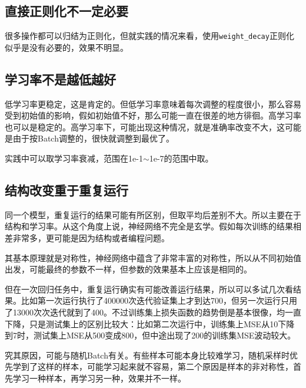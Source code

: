 \subsection{直接正则化不一定必要}
很多操作都可以归结为正则化，但就实践的情况来看，使用\texttt{weight\_decay}正则化似乎是没有必要的，效果不明显。

\subsection{学习率不是越低越好}
低学习率更稳定，这是肯定的。但低学习率意味着每次调整的程度很小，那么容易受到初始值的影响，假如初始值不好，那么可能一直在很差的地方徘徊。高学习率也可以是稳定的。高学习率下，可能出现这种情况，就是准确率改变不大，这可能是由于按Batch调整的，很快就调整到最优了。

实践中可以取学习率衰减，范围在1e-1$\sim$1e-7的范围中取。
\subsection{结构改变重于重复运行}
同一个模型，重复运行的结果可能有所区别，但取平均后差别不大。所以主要在于结构和学习率。从这个角度上说，神经网络不完全是玄学。假如每次训练的结果相差非常多，更可能是因为结构或者编程问题。

其基本原理就是对称性，神经网络中蕴含了非常丰富的对称性，所以从不同初始值出发，可能最终的参数不一样，但参数的效果基本上应该是相同的。

但在一次回归任务中，重复运行确实有可能改善运行结果，所以可以多试几次看结果。比如第一次运行执行了400000次迭代验证集上才到达700，但另一次运行只用了13000次次迭代就到了400。不过训练集上损失函数的趋势倒是基本很像，均一直下降，只是测试集上的区别比较大：比如第二次运行中，训练集上MSE从10下降到7时，测试集上MSE从500变成800，但中途出现了200的训练集MSE波动较大。

究其原因，可能与随机Batch有关。有些样本可能本身比较难学习，随机采样时优先学到了这样的样本，可能学习起来就不容易，第二个原因是样本的非对称性，首先学习一种样本，再学习另一种，效果并不一样。


